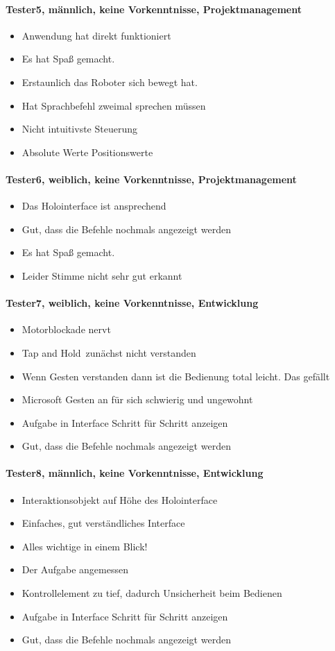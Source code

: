 \paragraph*{Tester5, männlich, keine Vorkenntnisse, Projektmanagement}
\begin{itemize}
	\item Anwendung hat direkt funktioniert
	\item Es hat Spaß gemacht.
	\item Erstaunlich das Roboter sich bewegt hat.
	\item Hat Sprachbefehl zweimal sprechen müssen
	\item Nicht intuitivste Steuerung
	\item Absolute Werte Positionswerte
\end{itemize}
\paragraph*{Tester6, weiblich, keine Vorkenntnisse, Projektmanagement}
\begin{itemize}
	\item Das Holointerface ist ansprechend
	\item Gut, dass die Befehle nochmals  angezeigt werden
	\item Es hat Spaß gemacht.
	\item Leider Stimme nicht sehr gut erkannt
\end{itemize}
\paragraph*{Tester7, weiblich, keine Vorkenntnisse, Entwicklung}
\begin{itemize}
	\item Motorblockade nervt
	\item \frqq Tap and Hold\flqq\ zunächst nicht verstanden
	\item Wenn Gesten verstanden dann ist die Bedienung total leicht. Das gefällt
	\item Microsoft Gesten an für sich schwierig und ungewohnt
	\item Aufgabe in Interface Schritt für Schritt anzeigen
	\item Gut, dass die Befehle nochmals  angezeigt werden
\end{itemize}
\paragraph*{Tester8, männlich, keine Vorkenntnisse, Entwicklung}
\begin{itemize}
	\item Interaktionsobjekt auf Höhe des Holointerface
	\item Einfaches, gut verständliches Interface
	\item Alles wichtige in einem Blick!
	\item Der Aufgabe angemessen
	\item Kontrollelement zu tief, dadurch Unsicherheit beim Bedienen
	\item Aufgabe in Interface Schritt für Schritt anzeigen
	\item Gut, dass die Befehle nochmals  angezeigt werden
\end{itemize}